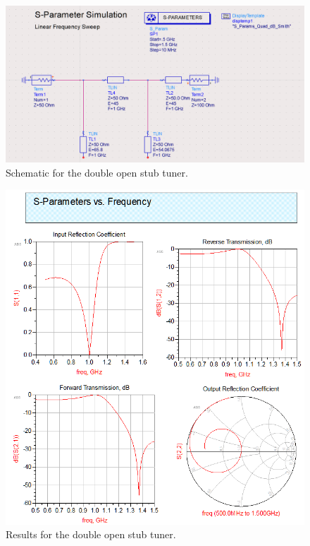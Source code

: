 \begin{figure}[H]
    \centering
    \includegraphics[width=0.8\linewidth]{res/ADS/DoubleOpenStubSchematic.png}
    \caption{Schematic for the double open stub tuner.}
    \label{fig:}
\end{figure}
\begin{figure}[H]
    \centering
    \includegraphics[width=0.8\linewidth]{res/ADS/DoubleOpenStub.png}
    \caption{Results for the double open stub tuner.}
    \label{fig:}
\end{figure}
